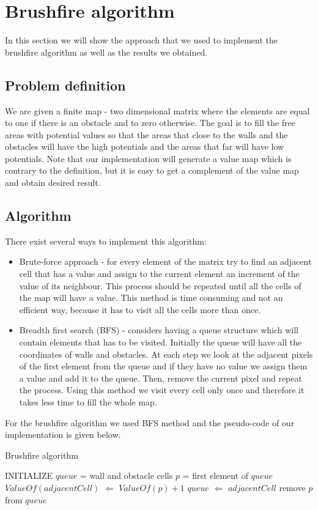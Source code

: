 \documentclass[a4paper]{article}
\begin{document}
\section{Brushfire algorithm}
In this section we will show the approach that we used to implement the brushfire algorithm as well as the results we obtained.
\subsection*{Problem definition}
We are given a finite map - two dimensional matrix where the elements are equal to one if there is an obstacle and to zero otherwise. The goal is to fill the free areas with potential values  so that the areas that close to the walls and the obstacles will have the high potentials and the areas that far will have low potentials. Note that our implementation will generate a value map which is contrary to the definition, but it is easy to get a complement of the value map and obtain desired result.
\subsection*{Algorithm}
There exist several ways to implement this algorithm:
\begin{itemize}
\item Brute-force approach - for every element of the matrix try to find an adjacent cell that has a value and assign to the current element an increment of the value of its neighbour. This process should be repeated until all the cells of the map will have a value. This method is time consuming and not an efficient way, because it has to visit all the cells more than once.
\item Breadth first search (BFS) - considers having a queue structure which will contain elements that has to be visited. Initially the queue will have all the coordinates of walls and obstacles. At each step we look at the adjacent pixels of the first element from the queue and if they have no value we assign them a value and add it to the queue. Then, remove the current pixel and repeat the process. Using this method we visit every cell only once and therefore it takes less time to fill the whole map.
\end{itemize}
For the brushfire algorithm we used BFS method and the pseudo-code of our implementation is given below.
\begin{algorithm}[H]
\caption{Brushfire algorithm}
\label{brushfireAlgo}
\begin{algorithmic}[1]
\STATE INITIALIZE $queue$ = wall and obstacle cells
\STATE $p$ = first element of $queue$
\STATE $ValueOf(adjacentCell)$ $\Leftarrow$ $ValueOf(p) + 1$
\STATE $queue$ $\Leftarrow$ $adjacentCell$
\ENDIF
\ENDFOR
\STATE remove $p$ from $queue$
\ENDWHILE
\end{algorithmic}
\end{algorithm}
\end{document}

